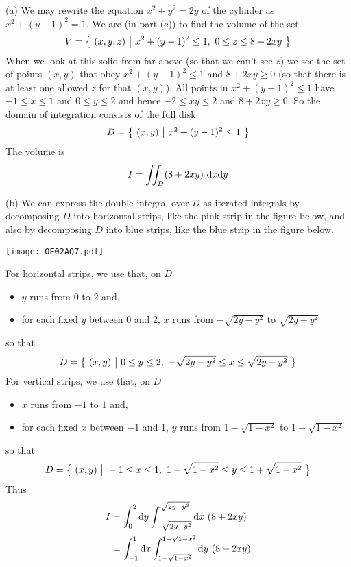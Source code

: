 \begin{solution}
(a) We may rewrite the equation $x^2+y^2=2y$ of the cylinder as
$x^2+(y-1)^2=1$. We are (in part (c)) to find the volume of the set
\begin{equation*}
V=\big\{ \ (x,y,z)\ \big|\ x^2+(y-1)^2\le 1,\ 0\le z\le 8+2xy\ \big\}
\end{equation*}
When we look at this solid from far above (so that we can't see $z$) 
we see the set of points $(x,y)$ that 
obey $x^2+(y-1)^2\le 1$ and $8+2xy\ge 0$ (so that there is at least one allowed $z$ for that $(x,y)$). All points in $x^2+(y-1)^2\le 1$
have $-1\le x\le 1$ and $0\le y\le 2$ and hence $-2\le xy\le 2$ and
$8+2xy\ge 0$. So the domain of integration consists of the full disk
\begin{equation*}
D = \big\{ \ (x,y)\ \big|\ x^2+(y-1)^2\le 1\ \big\}
\end{equation*}
The volume is 
\begin{equation*}
I=\dblInt_D (8+2xy)\ \dee{x}\dee{y}
\end{equation*}

(b)
We can express the double integral over $D$ as iterated integrals by
decomposing $D$ into horizontal strips, like the pink strip in the 
figure below, and also by decomposing $D$ into blue strips, like the 
blue strip in the figure below.
\begin{center}
     \texttt{[image: OE02AQ7.pdf]} 
\end{center}
For horizontal strips, we use that, on $D$
\begin{itemize}
\item
$y$ runs from $0$ to $2$ and,
\item
for each fixed $y$ between $0$ and $2$, $x$ runs from $-\sqrt{2y-y^2}$
to $\sqrt{2y-y^2}$ 
\end{itemize}
so that
\begin{equation*}
D=\Set{(x,y)}{0\le y\le 2,\ -\sqrt{2y-y^2}\le x\le \sqrt{2y-y^2}}
\end{equation*}
For vertical strips, we use that, on $D$
\begin{itemize}
\item
$x$ runs from $-1$ to $1$ and,
\item
for each fixed $x$ between $-1$ and $1$, $y$ runs from $1-\sqrt{1-x^2}$
to $1+\sqrt{1-x^2}$ 
\end{itemize}
so that
\begin{equation*}
D=\Set{(x,y)}{-1\le x\le 1,\ 1-\sqrt{1-x^2}\le y\le 1+\sqrt{1-x^2}}
\end{equation*}
Thus
\begin{align*}
I&=\int_0^2 \dee{y}\int_{-\sqrt{2y-y^2}}^{\sqrt{2y-y^2}}\dee{x}\ (8+2xy) \\
 &=\int_{-1}^1 \dee{x}\int_{1-\sqrt{1-x^2}}^{1+\sqrt{1-x^2}}\dee{y}\ (8+2xy)
\end{align*}


\end{solution}

